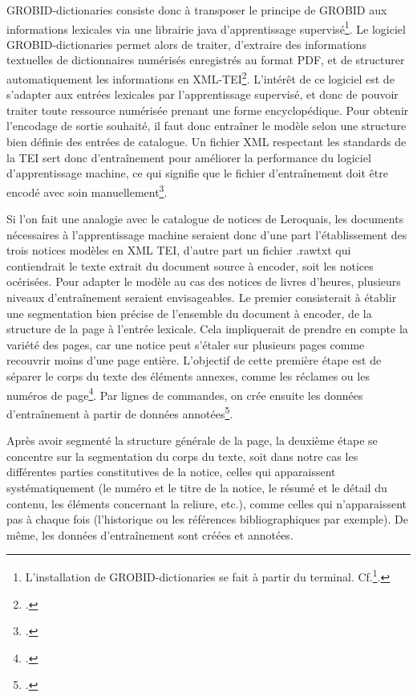 \documentclass[a4paper,12pt,twoside]{book}
\begin{document}
	GROBID-dictionaries consiste donc à transposer le principe de GROBID aux informations lexicales via une librairie java d'apprentissage supervisé\footnote{L'installation de GROBID-dictionaries se fait à partir du terminal. Cf.\footcite[p. 14]{Grobid_catalogues}.}. Le logiciel GROBID-dictionaries permet alors de traiter, d'extraire des informations textuelles de dictionnaires numérisés enregistrés au format PDF, et de structurer automatiquement les informations en XML-TEI\footcite[p. 34]{encoder_auto_catalogue}. L'intérêt de ce logiciel est de s'adapter aux entrées lexicales par l'apprentissage supervisé, et donc de pouvoir traiter toute ressource numérisée prenant une forme encyclopédique. Pour obtenir l'encodage de sortie souhaité, il faut donc entraîner le modèle selon une structure bien définie des entrées de catalogue. Un fichier XML respectant les standards de la TEI sert donc d'entraînement pour améliorer la performance du logiciel d'apprentissage machine, ce qui signifie que le fichier d'entraînement doit être encodé avec soin manuellement\footcite[p. 39]{encoder_auto_catalogue}. 
	
	Si l'on fait une analogie avec le catalogue de notices de Leroquais, les documents nécessaires à l'apprentissage machine seraient donc d'une part l'établissement des trois notices modèles en XML TEI, d'autre part un fichier .rawtxt qui contiendrait le texte extrait du document source à encoder, soit les notices océrisées. Pour adapter le modèle au cas des notices de livres d'heures, plusieurs niveaux d'entraînement seraient envisageables. Le premier consisterait à établir une segmentation bien précise de l'ensemble du document à encoder, de la structure de la page à l'entrée lexicale. Cela impliquerait de prendre en compte la variété des pages, car une notice peut s'étaler sur plusieurs pages comme recouvrir moins d'une page entière. L'objectif de cette première étape est de séparer le corps du texte des éléments annexes, comme les réclames ou les numéros de page\footcite[p. 21-22]{Grobid_catalogues}. Par lignes de commandes, on crée ensuite les données d'entraînement à partir de données annotées\footcite[p. 23-25]{Grobid_catalogues}. 

Après avoir segmenté la structure générale de la page, la deuxième étape se concentre sur la segmentation du corps du texte, soit dans notre cas les différentes parties constitutives de la notice, celles qui apparaissent systématiquement (le numéro et le titre de la notice, le résumé et le détail du contenu, les éléments concernant la reliure, etc.), comme celles qui n'apparaissent pas à chaque fois (l'historique ou les références bibliographiques par exemple). De même, les données d'entraînement sont créées et annotées. 
\end{document}
